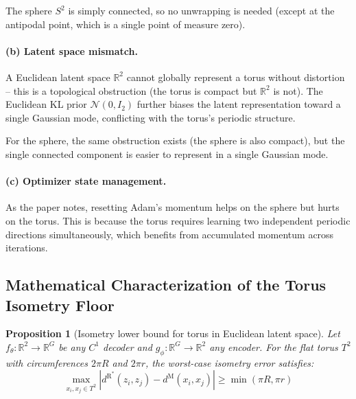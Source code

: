 \documentclass{article}
\newtheorem{proposition}{Proposition}
\newcommand{\dR}{d^{\mathrm{R}}}
\newcommand{\dM}{d^{\mathrm{M}}}
\newcommand{\RR}{\mathbb{R}}
\begin{document}
The sphere $S^2$ is simply connected, so no unwrapping is needed (except at
the antipodal point, which is a single point of measure zero).

\paragraph{(b) Latent space mismatch.}
A Euclidean latent space $\RR^2$ cannot globally represent a torus without
distortion -- this is a topological obstruction (the torus is compact but
$\RR^2$ is not). The Euclidean KL prior $\mathcal{N}(0, I_2)$ further biases
the latent representation toward a single Gaussian mode, conflicting with the
torus's periodic structure.

For the sphere, the same obstruction exists (the sphere is also compact), but
the single connected component is easier to represent in a single Gaussian
mode.

\paragraph{(c) Optimizer state management.}
As the paper notes, resetting Adam's momentum helps on the sphere but hurts
on the torus. This is because the torus requires learning two independent
periodic directions simultaneously, which benefits from accumulated momentum
across iterations.

\subsection{Mathematical Characterization of the Torus Isometry Floor}

\begin{proposition}[Isometry lower bound for torus in Euclidean latent space]
\label{prop:torus_floor}
Let $f_\theta: \RR^2 \to \RR^G$ be any $C^1$ decoder and
$g_\phi: \RR^G \to \RR^2$ any encoder. For the flat torus $T^2$ with
circumferences $2\pi R$ and $2\pi r$, the worst-case isometry error satisfies:
\begin{equation}
    \max_{x_i, x_j \in T^2}
    |\dR^*(z_i, z_j) - \dM(x_i, x_j)|
    \geq \min(\pi R, \pi r)
\end{equation}
\end{proposition}
\end{document}
